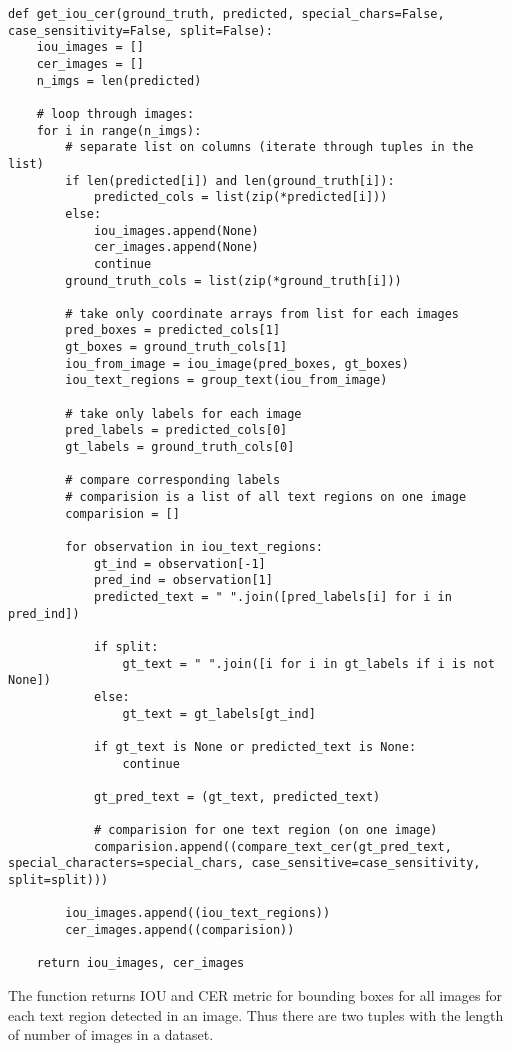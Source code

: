 \begin{lstlisting}[caption=get\_iou\_cer]
def get_iou_cer(ground_truth, predicted, special_chars=False, case_sensitivity=False, split=False):
    iou_images = []
    cer_images = []
    n_imgs = len(predicted)
    
    # loop through images:
    for i in range(n_imgs):
        # separate list on columns (iterate through tuples in the list)
        if len(predicted[i]) and len(ground_truth[i]):
            predicted_cols = list(zip(*predicted[i]))
        else:
            iou_images.append(None)
            cer_images.append(None)
            continue
        ground_truth_cols = list(zip(*ground_truth[i]))

        # take only coordinate arrays from list for each images
        pred_boxes = predicted_cols[1]
        gt_boxes = ground_truth_cols[1]
        iou_from_image = iou_image(pred_boxes, gt_boxes)
        iou_text_regions = group_text(iou_from_image)
      
        # take only labels for each image
        pred_labels = predicted_cols[0]
        gt_labels = ground_truth_cols[0]

        # compare corresponding labels
        # comparision is a list of all text regions on one image
        comparision = []

        for observation in iou_text_regions:
            gt_ind = observation[-1]
            pred_ind = observation[1]
            predicted_text = " ".join([pred_labels[i] for i in pred_ind])

            if split:
                gt_text = " ".join([i for i in gt_labels if i is not None])
            else:
                gt_text = gt_labels[gt_ind]

            if gt_text is None or predicted_text is None:
                continue
                
            gt_pred_text = (gt_text, predicted_text)

            # comparision for one text region (on one image)
            comparision.append((compare_text_cer(gt_pred_text, special_characters=special_chars, case_sensitive=case_sensitivity, split=split)))

        iou_images.append((iou_text_regions))
        cer_images.append((comparision))

    return iou_images, cer_images
\end{lstlisting}

The function  returns IOU and CER metric for bounding boxes for all images for each text region detected in an image. Thus there are two tuples with the length of number of images in a dataset.


